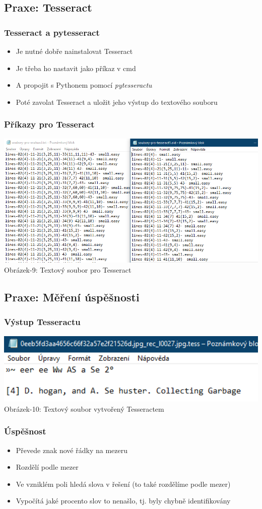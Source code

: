 \documentclass{beamer}
\begin{document}
\subsection{Praxe: Tesseract}
\begin{frame}
\frametitle{Tesseract a pytesseract}
\begin{itemize}
\item Je nutné dobře nainstalovat Tesseract
\item Je třeba ho nastavit jako příkaz v cmd
\item A propojit s Pythonem pomocí \emph{pytesseractu}
\item Poté zavolat Tesseract a uložit jeho výstup do textového souboru
\end{itemize}
\end{frame}
\begin{frame}
\frametitle{Příkazy pro Tesseract}
\centering
	\includegraphics[width=1.15\textwidth]{img/pro-tesseract-evaluaci.png}\\
	Obrázek-9: Textový soubor pro Tesseract
\end{frame}
\subsection{Praxe: Měření úspěšnosti}
\begin{frame}
\frametitle{Výstup Tesseractu}
\centering	\includegraphics[width=1.1\textwidth]{img/vystup-tess.png}\\
Obrázek-10: Textový soubor vytvořený Tesseractem
\end{frame}
\begin{frame}
\frametitle{Úspěšnost}
\begin{itemize}
\item Převede znak nové řádky na mezeru
\item Rozdělí podle mezer
\item Ve vzniklém poli hledá slova v řešení (to také rozdělíme podle mezer)
\item Vypočítá jaké procento slov to nenašlo, tj. byly chybně identifikovány
\end{itemize}
\end{frame}
\end{document}
